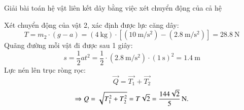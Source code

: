 \begin{dang}{Giải bài toán hệ vật liên kết dây bằng việc xét chuyển động của cả hệ}
{{\begin{enumerate}[label=\alph*)]
		Xét chuyển động của vật 2, xác định được lực căng dây:
		$$T=m_2\cdot\left(g-a\right)=\left(\SI{4}{\kilogram}\right)\cdot\left[\left(\SI{10}{\meter/\second^2}\right)-\left(\SI{2.8}{\meter/\second^2}\right)\right]=\SI{28.8}{\newton}$$
		Quãng đường mỗi vật đi được sau 1 giây:
		$$s=\dfrac{1}{2}at^2=\dfrac{1}{2}\cdot\left(\SI{2.8}{\meter/\second^2}\right)\cdot\left(\SI{1}{\second}\right)^2=\SI{1.4}{\meter}$$
		Lực nén lên trục ròng rọc:
		$$\overrightarrow{Q}=\overrightarrow{T_1}+\overrightarrow{T_2}$$
		$$\Rightarrow Q=\sqrt{T^2_1+T^2_2}=T\sqrt{2}=\xsi{\dfrac{144\sqrt{2}}{5}}{\newton}.$$
	\end{enumerate}
}}
\end{dang}

